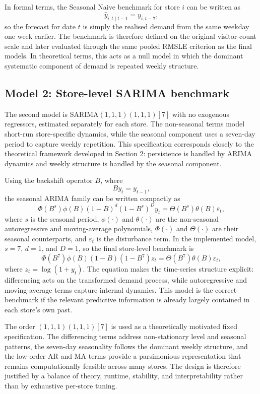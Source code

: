 \documentclass[11pt,oneside]{scrartcl}
\begin{document}
In formal terms, the Seasonal Naive benchmark for store $i$ can be written as
\[
\hat{y}_{i,t\mid t-1} = y_{i,t-7},
\]
so the forecast for date $t$ is simply the realised demand from the same weekday one week earlier. The benchmark is therefore defined on the original visitor-count scale and later evaluated through the same pooled RMSLE criterion as the final models. In theoretical terms, this acts as a null model in which the dominant systematic component of demand is repeated weekly structure.

\subsection{Model 2: Store-level SARIMA benchmark}
The second model is SARIMA$(1,1,1)(1,1,1)[7]$ with no exogenous regressors, estimated separately for each store. The non-seasonal terms model short-run store-specific dynamics, while the seasonal component uses a seven-day period to capture weekly repetition. This specification corresponds closely to the theoretical framework developed in Section 2: persistence is handled by ARIMA dynamics and weekly structure is handled by the seasonal component.

Using the backshift operator $B$, where
\[
By_t = y_{t-1},
\]
the seasonal ARIMA family can be written compactly as
\[
\Phi(B^s)\phi(B)(1-B)^d(1-B^s)^D y_t
=
\Theta(B^s)\theta(B)\varepsilon_t,
\]
where $s$ is the seasonal period, $\phi(\cdot)$ and $\theta(\cdot)$ are the non-seasonal autoregressive and moving-average polynomials, $\Phi(\cdot)$ and $\Theta(\cdot)$ are their seasonal counterparts, and $\varepsilon_t$ is the disturbance term. In the implemented model, $s=7$, $d=1$, and $D=1$, so the final store-level benchmark is
\[
\Phi(B^7)\phi(B)(1-B)(1-B^7) z_t
=
\Theta(B^7)\theta(B)\varepsilon_t,
\]
where $z_t=\log(1+y_t)$. The equation makes the time-series structure explicit: differencing acts on the transformed demand process, while autoregressive and moving-average terms capture internal dynamics. This model is the correct benchmark if the relevant predictive information is already largely contained in each store's own past.

The order $(1,1,1)(1,1,1)[7]$ is used as a theoretically motivated fixed specification. The differencing terms address non-stationary level and seasonal patterns, the seven-day seasonality follows the dominant weekly structure, and the low-order AR and MA terms provide a parsimonious representation that remains computationally feasible across many stores. The design is therefore justified by a balance of theory, runtime, stability, and interpretability rather than by exhaustive per-store tuning.
\end{document}
